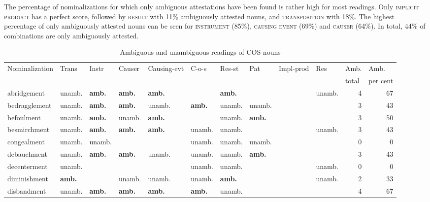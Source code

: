 \begin{sloppypar}
The percentage of nominalizations for which only ambiguous attestations have been found is rather high for most readings. Only \textsc{implicit product} has a perfect score, followed by \textsc{result} with 11\% ambiguously attested nouns, and \textsc{transposition} with 18\%. The highest percentage of only ambiguously attested nouns can be seen for \textsc{instrument} (85\%), \textsc{causing event} (69\%) and \textsc{causer} (64\%). In total, 44\% of combinations are only ambiguously attested.
\end{sloppypar}

\begin{sidewaystable}[ph!]
\caption[Ambiguous and unambiguous readings of COS nouns]{Ambiguous and unambiguous readings of COS nouns} 
\label{tab:AmbiguityCOS}
\begin{footnotesize}
\begin{tabular}{llllllllllrr}
\lsptoprule
Nominalization          & Trans   & Instr   & Causer  & Causing-evt & C-o-s   & Res-st  & Pat & Impl-prod & Res & \multicolumn{1}{l}{Amb.}  & \multicolumn{1}{l}{Amb.} \\
&&&&&&&&&&\multicolumn{1}{l}{total}&\multicolumn{1}{l}{per cent}\\
\midrule
 abridgement & unamb. & \textbf{amb.} & \textbf{amb.} & \textbf{amb.} &  & \textbf{amb.} &  &  & unamb. & 4 & 67\\
bedragglement & unamb. & \textbf{amb.} & \textbf{amb.} & unamb. & \textbf{amb.} & unamb. & unamb. &  &  & 3 & 43\\
 befoulment & unamb. & \textbf{amb.} & unamb. & \textbf{amb.} &  & unamb. & \textbf{amb.} &  &  & 3 & 50\\
besmirchment & unamb. & \textbf{amb.} & \textbf{amb.} & \textbf{amb.} & unamb. & unamb. &  &  & unamb. & 3 & 43\\
 congealment & unamb. & unamb. &  &  & unamb. & unamb. & unamb. &  &  & 0 & 0\\
debauchment & unamb. & \textbf{amb.} & \textbf{amb.} & unamb. & unamb. & unamb. & \textbf{amb.} &  &  & 3 & 43\\
 decenterment & unamb. &  &  &  & unamb. & unamb. &  &  & unamb. & 0 & 0 \\
diminishment & \textbf{amb.} &  & unamb. & unamb. & unamb. & \textbf{amb.} &  &  & unamb. & 2 & 33\\
 disbandment & unamb. & \textbf{amb.} & \textbf{amb.} & \textbf{amb.} & \textbf{amb.} & unamb. &  &  &  & 4 & 67\\

\end{tabular}
\end{footnotesize}
\end{sidewaystable}
